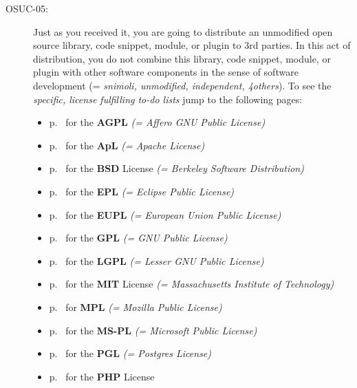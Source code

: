 \begin{description}
\item[OSUC-05:]\label{OSUC-05-DEF} Just as you received it, you are going to
distribute an unmodified open source library, code snippet, module, or plugin to
3rd parties. In this act of distribution, you do not combine this library, code
snippet, module, or plugin with other software components in the sense of
software development (= \textit{snimoli, unmodified, independent, 4others}).
To see the \textit{specific, license fulfilling to-do lists} jump to the
following pages:
  \begin{itemize}
    \item p.\ \pageref{OSUC-05-AGPL} for the \textbf{AGPL}
      \textit{(= Affero GNU Public License)} 
    \item p.\ \pageref{OSUC-05-Apache20} for the \textbf{ApL}
      \textit{(= Apache License)}
    \item p.\ \pageref{OSUC-05-BSD} for the \textbf{BSD} License
      \textit{(= Berkeley Software Distribution)}
    \item p.\ \pageref{OSUC-05-EPL} for the \textbf{EPL}
      \textit{(= Eclipse Public License)}     
    \item p.\ \pageref{OSUC-05-EUPL} for the \textbf{EUPL}
      \textit{(= European Union Public License)} 
    \item p.\ \pageref{OSUC-05-GPL} for the \textbf{GPL}
       \textit{(= GNU Public License)} 
    \item p.\ \pageref{OSUC-05-LGPL} for the \textbf{LGPL}
      \textit{(= Lesser GNU Public License)}           
    \item p.\ \pageref{OSUC-05-MIT} for the \textbf{MIT} License
       \textit{(= Massachusetts Institute of Technology)} 
    \item p.\ \pageref{OSUC-05-MPL} for \textbf{MPL}
      \textit{(= Mozilla Public License)}     
    \item p.\ \pageref{OSUC-05-MS-PL} for the \textbf{MS-PL}
      \textit{(= Microsoft Public License)} 
    \item p.\ \pageref{OSUC-05-PGL} for the \textbf{PGL}
      \textit{(= Postgres License)} 
    \item p.\ \pageref{OSUC-05-PHP} for the \textbf{PHP} License 
  \end{itemize}


\end{description}
